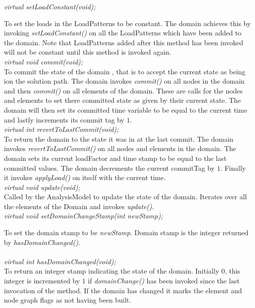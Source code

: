 {\em virtual setLoadConstant(void);} 

To set the loads in the LoadPatterns to be constant. The domain
achieves this by invoking {\em setLoadConstant()} on all the
LoadPatterns which have been added to the domain. Note that
LoadPatterns added after this method has been invoked will not be
constant until this method is invoked again. \\


{\em virtual void commit(void);} \\
To commit the state of the domain , that is to accept the current
state as being ion the solution path. The domain invokes {\em
commit()} on all nodes in the domain and then {\em 
commit()} on all elements of the domain. These are calls for the nodes
and elements to set there committed state as given by their current
state. The domain will then set its committed time variable to be
equal to the current time and lastly increments its commit tag by $1$. \\ 


{\em virtual int revertToLastCommit(void);} \\
To return the domain to the state it was in at the last commit. The
domain invokes {\em revertToLastCommit()} on all nodes and elements in
the domain. The domain sets its current loadFactor and time
stamp to be equal to the last committed values. The domain decrements
the current commitTag by $1$. Finally it invokes {\em applyLoad()}
on itself with the current time.\\

{\em virtual void update(void);} \\
Called by the AnalysisModel to update the state of the
domain. Iterates over all the elements of the Domain and invokes {\em
update()}. \\

{\em virtual void setDomainChangeStamp(int newStamp);}

To set the domain stamp to be {\em newStamp}. Domain stamp is the
integer returned by {\em hasDomainChanged()}. \\

 \\
{\em virtual int hasDomainChanged(void);} \\
To return an integer stamp indicating the state of the
domain. Initially $0$, this integer is incremented by $1$ if  {\em
domainChange()} has been invoked since the last invocation of the
method. If the domain has changed it marks the element and node graph
flags as not having been built.\\  

